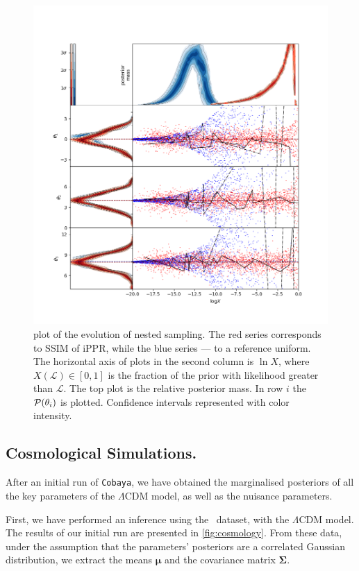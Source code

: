 \documentclass[usenatbib]{mnras}
\begin{document}
\begin{figure}
\includegraphics[width=.9\textwidth]{./illustrations/higson.png}
\caption{plot of the evolution of nested sampling. The \color{red} red
  \color{black} series corresponds to SSIM of iPPR, while the
  \color{blue} blue \color{black} series --- to a reference
  uniform. The horizontal axis of plots in the second column is
  \(\ln X\), where \(X(\mathcal{L}) \in [0,1]\) is the fraction of the
  prior with likelihood greater than \(\mathcal{L}\). The top plot is
  the relative posterior mass. In row $i$ the ${\cal P}(\theta_{i})$
  is plotted. Confidence intervals represented with color
  intensity. \label{fig:higson}}
\end{figure}

\subsection{Cosmological Simulations.}\label{sec:orgb81c159}
After an initial run of \texttt{Cobaya}, we have obtained the marginalised
posteriors of all the key parameters of the \(\Lambda\)CDM model,
as well as the nuisance parameters.

First, we have performed an inference using the~\cite{Planck} dataset,
with the \(\Lambda\)CDM model. The results of our initial run are
presented in \cref{fig:cosmology}. From these data, under the
assumption that the parameters' posteriors are a correlated Gaussian
distribution, we extract the means $\bm{\mu}$ and the covariance
matrix \(\bm{\Sigma}\).
\end{document}
